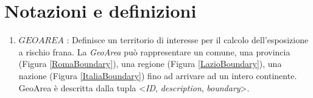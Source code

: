 
\chapter{Notazioni e definizioni} %

\label{ch:examples} %

\begin{enumerate}
	
	\item \textbf{$GEOAREA$} : Definisce un territorio di interesse per il calcolo dell'esposizione a rischio frana. La \textit{GeoArea} può rappresentare un comune, una provincia (Figura \ref{RomaBoundary}), una regione (Figura \ref{LazioBoundary}), una nazione (Figura \ref{ItaliaBoundary}) fino ad arrivare ad un intero continente. GeoArea è descritta dalla tupla <\textit{ID}, \textit{description}, \textit{boundary}>.
	

\end{enumerate}
